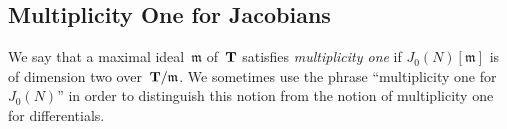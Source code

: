 \documentclass[10pt,twoside]{article}
\newcommand{\edit}[1]{\footnote{EDIT: #1}\marginpar{\hfill {\sf \thefootnote}}}
\newcommand{\T}{{\bf{T}}}
\newcommand{\m}{{\mathfrak{m}}}
\theoremstyle{definition}
\begin{document}

\subsection{Multiplicity One for Jacobians}

We say that a maximal ideal~$\m$ of~$\T$ satisfies {\it multiplicity one}
if $J_0(N)[\m]$ is of dimension two over~$\T/\m$. We sometimes use the
phrase ``multiplicity one for~$J_0(N)$'' in order to distinguish this notion
from the notion of multiplicity one for differentials. 
\end{document}
